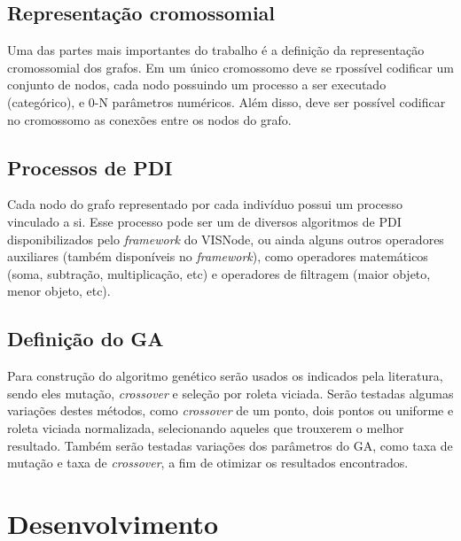 \documentclass[12pt,oneside,a4paper,english,french,spanish,brazil,]{abntex2}
\begin{document}
\section{Representação cromossomial}

Uma das partes mais importantes do trabalho é a definição da representação cromossomial dos grafos. Em um único cromossomo deve se rpossível codificar um conjunto de nodos, cada nodo possuindo um processo a ser executado (categórico), e 0-N parâmetros numéricos. Além disso, deve ser possível codificar no cromossomo as conexões entre os nodos do grafo.


\section{Processos de PDI}

Cada nodo do grafo representado por cada indivíduo possui um processo vinculado a si. Esse processo pode ser um de diversos algoritmos de PDI disponibilizados pelo \textit{framework} do VISNode, ou ainda alguns outros operadores auxiliares (também disponíveis no \textit{framework}), como operadores matemáticos (soma, subtração, multiplicação, etc) e operadores de filtragem (maior objeto, menor objeto, etc).

\section{Definição do GA}

Para construção do algoritmo genético serão usados os indicados pela literatura, sendo eles mutação, \textit{crossover} e seleção por roleta viciada. Serão testadas algumas variações destes métodos, como \textit{crossover} de um ponto, dois pontos ou uniforme e roleta viciada normalizada, selecionando aqueles que trouxerem o melhor resultado. Também serão testadas variações dos parâmetros do GA, como taxa de mutação e taxa de \textit{crossover}, a fim de otimizar os resultados encontrados.

\chapter{Desenvolvimento}
\end{document}
